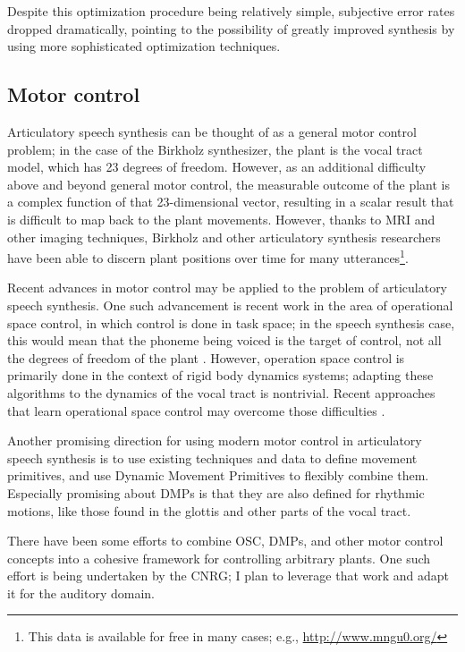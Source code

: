 \documentclass{article}
\begin{document}
Despite this optimization procedure
being relatively simple,
subjective error rates dropped dramatically,
pointing to the possibility
of greatly improved synthesis
by using more sophisticated optimization techniques.

\subsection{Motor control}

Articulatory speech synthesis
can be thought of as a
general motor control problem;
in the case of the Birkholz synthesizer,
the plant is the vocal tract model,
which has 23 degrees of freedom.
However, as an additional difficulty
above and beyond general motor control,
the measurable outcome of the plant
is a complex function of that
23-dimensional vector,
resulting in a scalar result
that is difficult to map
back to the plant movements.
However, thanks to MRI and other
imaging techniques,
Birkholz and other articulatory
synthesis researchers have
been able to discern
plant positions over time
for many utterances\footnote{This
data is available for free in many cases;
e.g., \url{http://www.mngu0.org/}}.

Recent advances in motor control
may be applied to the problem
of articulatory speech synthesis.
One such advancement is recent work
in the area of operational space control,
in which control is done in task space;
in the speech synthesis case,
this would mean that the phoneme being voiced
is the target of control,
not all the degrees of freedom of the plant
\citep{nakanishi2008}.
However, operation space control
is primarily done in the context
of rigid body dynamics systems;
adapting these algorithms
to the dynamics of the vocal tract
is nontrivial.
Recent approaches that learn
operational space control
may overcome those difficulties
\citep{peters2008}.

Another promising direction
for using modern motor control
in articulatory speech synthesis
is to use existing techniques and data
to define movement primitives,
and use Dynamic Movement Primitives
\citep{schaal2006} to flexibly combine them.
Especially promising about DMPs
is that they are also defined
for rhythmic motions,
like those found in the glottis
and other parts of the vocal tract.

There have been some efforts
to combine OSC, DMPs, and other motor control concepts
into a cohesive framework
for controlling arbitrary plants.
One such effort is being undertaken
by the CNRG;
I plan to leverage that work and adapt
it for the auditory domain.
\end{document}
